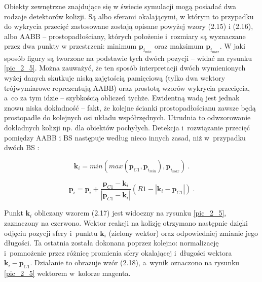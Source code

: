 				
				Obiekty zewnętrzne znajdujące się w świecie symulacji mogą posiadać dwa rodzaje detektorów kolizji. Są albo sferami okalającymi, w którym to przypadku do wykrycia przecięć zastosowane zostają opisane powyżej wzory (2.15) i (2.16), albo AABB -- prostopadłościany, których położenie i~rozmiary są wyznaczane przez dwa punkty w przestrzeni: minimum \(\mathbf{p}_{i_{min}}\) oraz maksimum \(\mathbf{p}_{i_{max}}\). W jaki sposób figury są tworzone na podstawie tych dwóch pozycji -- widać na rysunku \ref{pic_2_5}. Można zauważyć, że ten sposób interpretacji dwóch wymienionych wyżej danych skutkuje niską zajętością pamięciową (tylko dwa wektory trójwymiarowe reprezentują AABB) oraz prostotą wzorów wykrycia przecięcia, a~co za tym idzie -- szybkością obliczeń tychże. Ewidentną wadą jest jednak znowu niska dokładność -- fakt, że kolejne ścianki prostopadłościanu zawsze będą prostopadłe do kolejnych osi układu współrzędnych. Utrudnia to odwzorowanie dokładnych kolizji np. dla obiektów pochyłych. Detekcja i~rozwiązanie przecięć pomiędzy AABB i BS następuje według nieco innych zasad, niż w~przypadku dwóch BS \cite{wzory_sfera} \cite{wzory_sfera_box}:
				
				\begin{equation}
				\mathbf{k}_{i} =  min(max(\mathbf{p}_{C1}, \mathbf{p}_{i_{min}}), \mathbf{p}_{i_{max}})  \ .
				\end{equation}
				
				\begin{equation}
				\mathbf{p}_{i} = \mathbf{p}_{i} + \frac{\mathbf{p}_{C1} - \mathbf{k}_{i}}{|\mathbf{p}_{C1} - \mathbf{k}_{i}|}(R1 - |\mathbf{k}_{i} - \mathbf{p}_{C1}|) \ .
				\end{equation}
				
				
				Punkt \( \mathbf{k}_i \) obliczany wzorem (2.17) jest widoczny na rysunku \ref{pic_2_5}, zaznaczony na czerwono. Wektor reakcji na kolizję otrzymano następnie dzięki odjęciu pozycji sfery i~punktu \( \mathbf{k}_i \) (zielony wektor) oraz odpowiedniej zmianie jego długości. Ta ostatnia została dokonana poprzez kolejno: normalizację i~pomnożenie przez różnicę promienia sfery okalającej i~długości wektora \(\mathbf{k}_{i} - \mathbf{p}_{C1}\). Działanie to obrazuje wzór (2.18), a~wynik oznaczono na rysunku \ref{pic_2_5} wektorem w~kolorze magenta.
			
